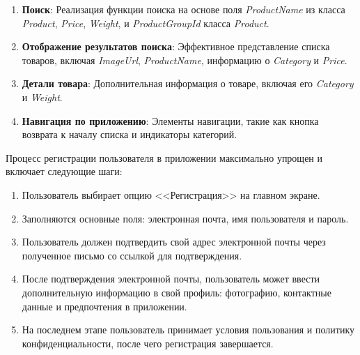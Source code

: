 \begin{enumerate}
    \item \textbf{Поиск}: Реализация функции поиска на основе поля \textit{ProductName} из класса \textit{Product}, \textit{Price}, \textit{Weight}, и \textit{ProductGroupId} класса \textit{Product}.
    \item \textbf{Отображение результатов поиска}: Эффективное представление списка товаров, включая \textit{ImageUrl}, \textit{ProductName}, информацию о \textit{Category} и \textit{Price}.
    \item \textbf{Детали товара}: Дополнительная информация о товаре, включая его \textit{Category} и \textit{Weight}.
    \item \textbf{Навигация по приложению}: Элементы навигации, такие как кнопка возврата к началу списка и индикаторы категорий.
\end{enumerate}

%

Процесс регистрации пользователя в приложении максимально упрощен и включает следующие шаги:
\begin{enumerate}
    \item Пользователь выбирает опцию <<Регистрация>> на главном экране.
    \item Заполняются основные поля: электронная почта, имя пользователя и пароль.
    \item Пользователь должен подтвердить свой адрес электронной почты через полученное письмо со ссылкой для подтверждения.
    \item После подтверждения электронной почты, пользователь может ввести дополнительную информацию в свой профиль: фотографию, контактные данные и предпочтения в приложении.
    \item На последнем этапе пользователь принимает условия пользования и политику конфиденциальности, после чего регистрация завершается.
\end{enumerate}

